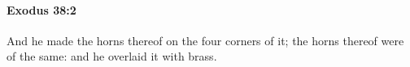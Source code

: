 
		\paragraph{Exodus 38:2} %
			\label{EXODUS-38-2}

			And he made the horns thereof on the four corners of it; the horns thereof were of the same: and he overlaid it with brass.


